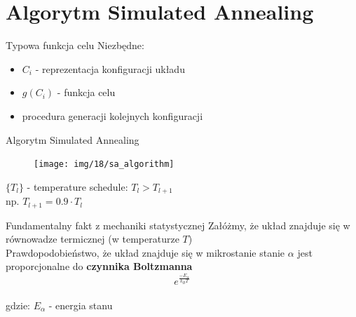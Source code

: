 \section{Algorytm Simulated Annealing}

\begin{frame}{Typowa funkcja celu}
		Niezbędne:
		\begin{itemize}
			\item $C_i$ - reprezentacja konfiguracji układu
			\item $g(C_i)$ - funkcja celu
			\item procedura generacji kolejnych konfiguracji
		\end{itemize}
	\end{frame}	
	\begin{frame}{Algorytm Simulated Annealing}
		\begin{figure}
			\texttt{[image: img/18/sa\_algorithm]}
		\end{figure}
		$\{T_l\}$ - temperature schedule: $T_l > T_{l+1}$\\
		np. $T_{l+1} = 0.9 \cdot T_l$
	\end{frame}

	\begin{frame}{Fundamentalny fakt z mechaniki statystycznej}
		Załóżmy, że układ znajduje się w równowadze termicznej (w temperaturze $T$)\\
	Prawdopodobieństwo, że układ znajduje się w mikrostanie  stanie $\alpha$ jest proporcjonalne do {\bf czynnika Boltzmanna}  $$e^{\frac{-E_\alpha}{k_B T}}$$\\
		gdzie: $E_\alpha$ - energia stanu
	
		
		
	\end{frame}


